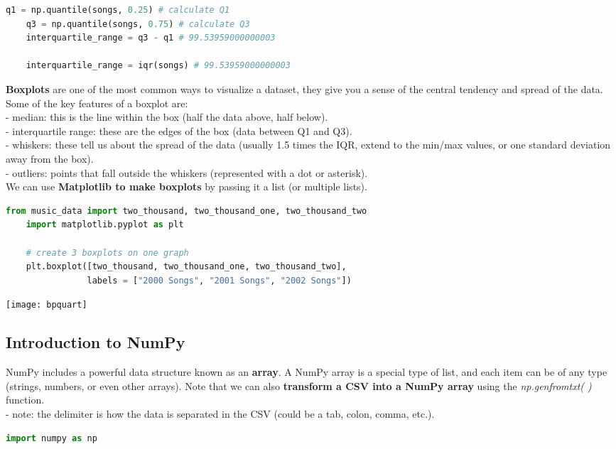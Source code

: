 \documentclass[11pt, a4paper]{article}
\begin{document}
\begin{spacing}{1.1}
\begin{lstlisting}[language=Python]
	q1 = np.quantile(songs, 0.25) # calculate Q1
	q3 = np.quantile(songs, 0.75) # calculate Q3
	interquartile_range = q3 - q1 # 99.53959000000003
	
	interquartile_range = iqr(songs) # 99.53959000000003 \end{lstlisting}\vspace*{4mm}
	\textbf{Boxplots} are one of the most common ways to visualize a dataset, they give you a sense of the central tendency and spread of the data. Some of the key features of a boxplot are: \\
	\hspace*{3mm} - median: this is the line within the box (half the data above, half below). \\
	\hspace*{3mm} - interquartile range: these are the edges of the box (data between Q1 and Q3). \\
	\hspace*{3mm} - whiskers: these tell us about the spread of the data (usually 1.5 times the IQR, extend to the \hspace*{24mm} min/max values, or one standard deviation away from the box). \\
	\hspace*{3mm} - outliers: points that fall outside the whiskers (represented with a dot or asterisk). \vspace*{1mm} \\
	We can use \textbf{Matplotlib to make boxplots} by passing it a list (or multiple lists). 
	\begin{lstlisting}[language=Python]
	from music_data import two_thousand, two_thousand_one, two_thousand_two
	import matplotlib.pyplot as plt
	
	# create 3 boxplots on one graph
	plt.boxplot([two_thousand, two_thousand_one, two_thousand_two], 
	            labels = ["2000 Songs", "2001 Songs", "2002 Songs"]) \end{lstlisting}\vspace*{1mm}
	\texttt{[image: bpquart]} \newpage
	\subsection{Introduction to NumPy}
	NumPy includes a powerful data structure known as an \textbf{array}. A NumPy array is a special type of list, and each item can be of any type (strings, numbers, or even other arrays). Note that we can also \textbf{transform a CSV into a NumPy array} using the \textit{np.genfromtxt( )} function. \\
	\hspace*{3mm} - note: the delimiter is how the data is separated in the CSV (could be a tab, colon, comma, etc.).
	\begin{lstlisting}[language=Python]
	import numpy as np
	

\end{lstlisting}
\end{spacing}
\end{document}
